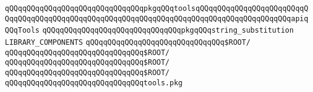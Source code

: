 \verb|qQQqqQQqqQQqqQQqqQQqqQQqqQQqqQQqpkgqQQqtoolsqQQqqQQqqQQqqQQqqQQqqQQqqQQqqQQqqQQqqQQqqQQqqQQqqQQqqQQqqQQqqQQqqQQqqQQqqQQqqQQqqQQqqQQqqQQqapiqQQqTools|\newline
\verb|qQQqqQQqqQQqqQQqqQQqqQQqqQQqqQQqpkgqQQqstring_substitution|\newline
\newline
\newline
\newline
\verb|LIBRARY_COMPONENTS|\newline
\verb|qQQqqQQqqQQqqQQqqQQqqQQqqQQqqQQq$ROOT/|\newline
\verb|qQQqqQQqqQQqqQQqqQQqqQQqqQQqqQQq$ROOT/|\newline
\verb|qQQqqQQqqQQqqQQqqQQqqQQqqQQqqQQq$ROOT/|\newline
\verb|qQQqqQQqqQQqqQQqqQQqqQQqqQQqqQQq$ROOT/|\newline
\verb|qQQqqQQqqQQqqQQqqQQqqQQqqQQqqQQqtools.pkg|\newline
\newline

